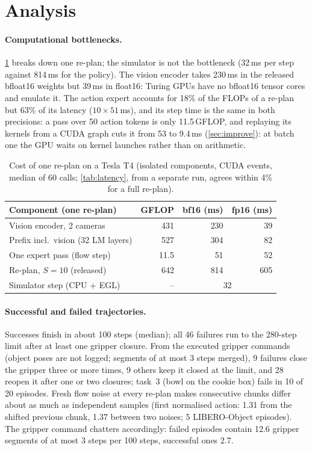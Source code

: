 \section{Analysis}
\label{sec:analysis}

\paragraph{Computational bottlenecks.}
\cref{tab:profile} breaks down one re-plan; the simulator is not the bottleneck (32\,ms per step against 814\,ms for the policy).
The vision encoder takes 230\,ms in the released bfloat16 weights but 39\,ms in float16: Turing GPUs have no bfloat16 tensor cores and emulate it.
The action expert accounts for 18\% of the FLOPs of a re-plan but 63\% of its latency ($10\times51$\,ms), and its step time is the same in both precisions: a pass over 50 action tokens is only 11.5\,GFLOP, and replaying its kernels from a CUDA graph cuts it from 53 to 9.4\,ms (\cref{sec:improve}): at batch one the GPU waits on kernel launches rather than on arithmetic.

\begin{table}[t]
\centering\footnotesize
\setlength{\tabcolsep}{3pt}
\begin{tabular}{@{}lrrr@{}}
\toprule
Component (one re-plan) & GFLOP & bf16 (ms) & fp16 (ms) \\
\midrule
Vision encoder, 2 cameras & 431 & 230 & 39 \\
Prefix incl.\ vision (32 LM layers) & 527 & 304 & 82 \\
One expert pass (flow step) & 11.5 & 51 & 52 \\
Re-plan, $S{=}10$ (released) & 642 & 814 & 605 \\
Simulator step (CPU + EGL) & -- & \multicolumn{2}{c}{32} \\
\bottomrule
\end{tabular}
\caption{Cost of one re-plan on a Tesla T4 (isolated components, CUDA events, median of 60 calls; \cref{tab:latency}, from a separate run, agrees within 4\% for a full re-plan).}
\label{tab:profile}
\end{table}

\paragraph{Successful and failed trajectories.}
Successes finish in about 100 steps (median); all 46 failures run to the 280-step limit after at least one gripper closure.
From the executed gripper commands (object poses are not logged; segments of at most 3 steps merged), 9 failures close the gripper three or more times, 9 others keep it closed at the limit, and 28 reopen it after one or two closures; task~3 (bowl on the cookie box) fails in 10 of 20 episodes.
Fresh flow noise at every re-plan makes consecutive chunks differ about as much as independent samples (first normalised action: 1.31 from the shifted previous chunk, 1.37 between two noises; 5 LIBERO-Object episodes).
The gripper command chatters accordingly: failed episodes contain 12.6 gripper segments of at most 3 steps per 100 steps, successful ones 2.7.

